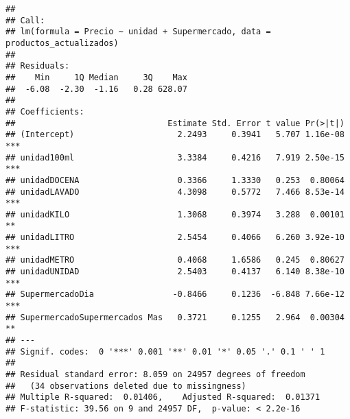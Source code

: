 \documentclass[
]{article}
\newenvironment{Shaded}{\begin{snugshade}}{\end{snugshade}}
\newcommand{\AttributeTok}[1]{\textcolor[rgb]{0.13,0.29,0.53}{#1}}
\newcommand{\CommentTok}[1]{\textcolor[rgb]{0.56,0.35,0.01}{\textit{#1}}}
\newcommand{\FunctionTok}[1]{\textcolor[rgb]{0.13,0.29,0.53}{\textbf{#1}}}
\newcommand{\NormalTok}[1]{#1}
\newcommand{\OtherTok}[1]{\textcolor[rgb]{0.56,0.35,0.01}{#1}}
\newcommand{\SpecialCharTok}[1]{\textcolor[rgb]{0.81,0.36,0.00}{\textbf{#1}}}
\newcommand{\StringTok}[1]{\textcolor[rgb]{0.31,0.60,0.02}{#1}}
\begin{document}
\begin{Shaded}
\end{Shaded}

\begin{verbatim}
## 
## Call:
## lm(formula = Precio ~ unidad + Supermercado, data = productos_actualizados)
## 
## Residuals:
##    Min     1Q Median     3Q    Max 
##  -6.08  -2.30  -1.16   0.28 628.07 
## 
## Coefficients:
##                               Estimate Std. Error t value Pr(>|t|)    
## (Intercept)                     2.2493     0.3941   5.707 1.16e-08 ***
## unidad100ml                     3.3384     0.4216   7.919 2.50e-15 ***
## unidadDOCENA                    0.3366     1.3330   0.253  0.80064    
## unidadLAVADO                    4.3098     0.5772   7.466 8.53e-14 ***
## unidadKILO                      1.3068     0.3974   3.288  0.00101 ** 
## unidadLITRO                     2.5454     0.4066   6.260 3.92e-10 ***
## unidadMETRO                     0.4068     1.6586   0.245  0.80627    
## unidadUNIDAD                    2.5403     0.4137   6.140 8.38e-10 ***
## SupermercadoDia                -0.8466     0.1236  -6.848 7.66e-12 ***
## SupermercadoSupermercados Mas   0.3721     0.1255   2.964  0.00304 ** 
## ---
## Signif. codes:  0 '***' 0.001 '**' 0.01 '*' 0.05 '.' 0.1 ' ' 1
## 
## Residual standard error: 8.059 on 24957 degrees of freedom
##   (34 observations deleted due to missingness)
## Multiple R-squared:  0.01406,    Adjusted R-squared:  0.01371 
## F-statistic: 39.56 on 9 and 24957 DF,  p-value: < 2.2e-16
\end{verbatim}
\end{document}
